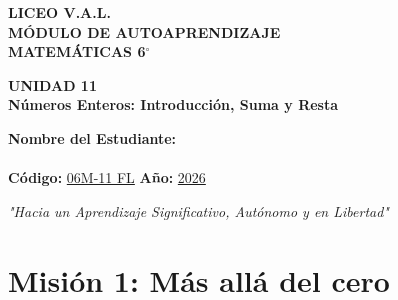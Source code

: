 \documentclass[12pt, letterpaper]{article}
\begin{document}
	
	\begin{center}
		\vspace*{1cm}
		{\Huge \textbf{LICEO V.A.L.}}\\[0.5cm]
		{\LARGE \textbf{MÓDULO DE AUTOAPRENDIZAJE}}\\[0.5cm]
		{\Large \textbf{MATEMÁTICAS 6$^\circ$}}\\[0.5cm]
		
		\begin{tcolorbox}[colback=valblue!10, colframe=valblue, arc=3mm, boxrule=1.5pt]
			\centering \Huge \textbf{UNIDAD 11}\\[0.2cm]
			\Large \textbf{Números Enteros: Introducción, Suma y Resta}
		\end{tcolorbox}
		
		\vspace{0.6cm}
		\begin{tcolorbox}[colback=white, colframe=valblue, width=12cm, arc=3mm, boxrule=1.5pt]
			\centering
			\vspace{0.3cm}
			\textbf{Nombre del Estudiante:}\\[0.3cm]
			\underline{\hspace{9cm}}\\[0.5cm]
			\textbf{Código:} \underline{06M-11 FL} \hspace{1cm} \textbf{Año:} \underline{2026}
			\vspace{0.3cm}
		\end{tcolorbox}
		
		\vspace{0.8cm}
		\textit{"Hacia un Aprendizaje Significativo, Autónomo y en Libertad"}
		
		
	\end{center}
	
	
	\section*{Misión 1: Más allá del cero}
	
\end{document}
